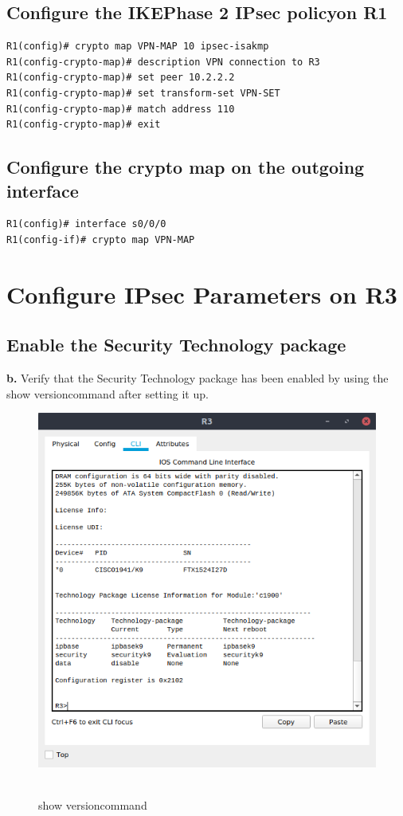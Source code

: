 \documentclass[12pt]{extarticle}
\begin{document}
\subsection{Configure the IKEPhase 2 IPsec policyon R1}
\begin{verbatim}
R1(config)# crypto map VPN-MAP 10 ipsec-isakmp
R1(config-crypto-map)# description VPN connection to R3
R1(config-crypto-map)# set peer 10.2.2.2
R1(config-crypto-map)# set transform-set VPN-SET
R1(config-crypto-map)# match address 110
R1(config-crypto-map)# exit
\end{verbatim}

\subsection{Configure the crypto map on the outgoing interface}
\begin{verbatim}
R1(config)# interface s0/0/0
R1(config-if)# crypto map VPN-MAP
\end{verbatim}

\section{Configure IPsec Parameters on R3}
\subsection{Enable the Security Technology package}
\textbf{b.} Verify that the Security Technology package has been enabled by using the show versioncommand after setting it up.
\begin{center}
\begin{figure}[H]
\includegraphics[scale=0.7]{resources/q201b.png}\
\caption{show versioncommand}
\end{figure}
\end{center}
\end{document}
